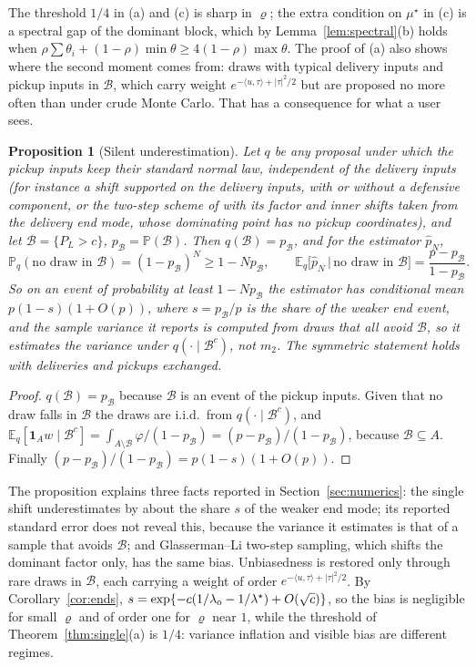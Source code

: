 \documentclass[pdflatex,sn-mathphys-ay]{sn-jnl}%
\theoremstyle{thmstyleone}%
\newtheorem{proposition}{Proposition}
\theoremstyle{thmstylethree}%
\theoremstyle{thmstyletwo}%
\newcommand{\E}{\mathbb{E}}
\renewcommand{\P}{\mathbb{P}}
\newcommand{\one}{\mathbf{1}}
\newcommand{\ip}[2]{\langle #1,#2\rangle}
\begin{document}
The threshold $1/4$ in (a) and (c) is sharp in $\varrho$; the extra condition on
$\mu^\star$ in (c) is a spectral gap of the dominant block, which by
Lemma~\ref{lem:spectral}(b) holds when
$\rho\sum\theta_i+(1-\rho)\min\theta\ge4(1-\rho)\max\theta$. The proof of (a) also shows
where the second moment comes from: draws with typical delivery inputs and pickup inputs in
$\mathcal{B}$, which carry weight $e^{-\ip u\tau+|\tau|^2/2}$ but are proposed no more often than
under crude Monte Carlo. That has a consequence for what a user sees.

\begin{proposition}[Silent underestimation]\label{prop:silent}
Let $q$ be any proposal under which the pickup inputs keep their standard normal law,
independent of the delivery inputs (for instance a shift supported on the delivery
inputs, with or without a defensive component, or the two-step scheme of
\citet{GlassermanLi2005} with its factor and inner shifts taken from the delivery end
mode, whose dominating point has no pickup coordinates), and let
$\mathcal{B}=\{P_L>c\}$, $p_{\mathcal{B}}=\P(\mathcal{B})$. Then $q(\mathcal{B})=p_{\mathcal{B}}$, and for the estimator $\hat p_N$,
\[
\P_q(\text{no draw in }\mathcal{B})=(1-p_{\mathcal{B}})^N\ge1-Np_{\mathcal{B}},\qquad
\E_q\big[\hat p_N\,\big|\,\text{no draw in }\mathcal{B}\big]=\frac{p-p_{\mathcal{B}}}{1-p_{\mathcal{B}}}.
\]
So on an event of probability at least $1-Np_{\mathcal{B}}$ the estimator has conditional mean
$p(1-s)(1+O(p))$, where $s=p_{\mathcal{B}}/p$ is the share of the weaker end event, and the
sample variance it reports is computed from draws that all avoid $\mathcal{B}$, so it estimates the
variance under $q(\cdot\mid \mathcal{B}^c)$, not $m_2$. The symmetric statement holds with
deliveries and pickups exchanged.
\end{proposition}

\begin{proof}
$q(\mathcal{B})=p_{\mathcal{B}}$ because $\mathcal{B}$ is an event of the pickup inputs. Given that no draw falls in
$\mathcal{B}$ the draws are i.i.d.\ from $q(\cdot\mid \mathcal{B}^c)$, and
$\E_q[\one_Aw\mid \mathcal{B}^c]=\int_{A\setminus \mathcal{B}}\varphi\big/(1-p_{\mathcal{B}})=(p-p_{\mathcal{B}})/(1-p_{\mathcal{B}})$, because
$\mathcal{B}\subseteq A$. Finally $(p-p_{\mathcal{B}})/(1-p_{\mathcal{B}})=p(1-s)(1+O(p))$.
\end{proof}

The proposition explains three facts reported in Section~\ref{sec:numerics}: the single
shift underestimates by about the share $s$ of the weaker end mode; its reported standard
error does not reveal this, because the variance it estimates is that of a sample that
avoids $\mathcal{B}$; and Glasserman--Li two-step sampling, which shifts the dominant factor only,
has the same bias. Unbiasedness is restored only through rare draws in $\mathcal{B}$, each
carrying a weight of order $e^{-\ip u\tau+|\tau|^2/2}$. By Corollary~\ref{cor:ends},
$s=\exp\{-c(1/\lambda_{\rm o}-1/\lambda^\star)+O(\sqrt c)\}$, so the bias is negligible
for small $\varrho$ and of order one for $\varrho$ near $1$, while the threshold of
Theorem~\ref{thm:single}(a) is $1/4$: variance inflation and visible bias are different
regimes.
\end{document}
